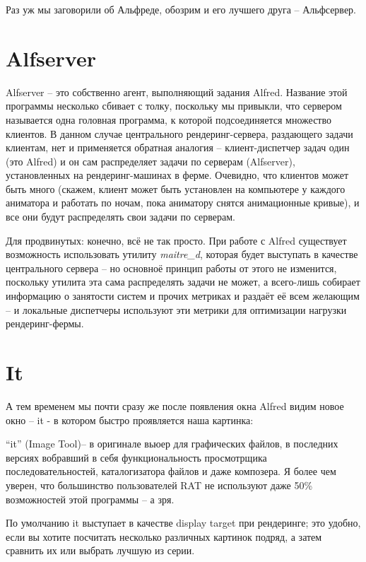 Раз уж мы заговорили об Альфреде, обозрим и его
    лучшего друга – Альфсервер.
  \section*{Alfserver}

 Alfserver – это собственно агент, выполняющий
    задания Alfred. Название этой программы несколько сбивает с толку,
    поскольку мы привыкли, что сервером называется одна головная
    программа, к которой подсоединяется множество клиентов. В данном
    случае центрального рендеринг-сервера, раздающего задачи клиентам,
    нет и применяется обратная аналогия – клиент-диспетчер задач один
    (это Alfred) и он сам распределяет задачи по серверам (Alfserver),
    установленных на рендеринг-машинах в ферме. Очевидно, что клиентов
    может быть много (скажем, клиент может быть установлен на
    компьютере у каждого аниматора и работать по ночам, пока аниматору
    снятся анимационные кривые), и все они будут распределять свои
    задачи по серверам.

 Для
    продвинутых: конечно, всё не так
    просто. При работе с Alfred существует
    возможность использовать утилиту {\it maitre\_d}, которая будет
    выступать в качестве центрального сервера – но основноё принцип
    работы от этого не изменится, поскольку утилита эта сама
    распределять задачи не может, а всего-лишь собирает информацию о
    занятости систем и прочих метриках и раздаёт её всем желающим – и
    локальные диспетчеры используют эти метрики для оптимизации
    нагрузки рендеринг-фермы.
  \section*{It}

 А тем временем мы почти сразу же после появления
    окна Alfred видим новое окно – it - в котором быстро проявляется
    наша картинка:


 “it” (Image Tool)– в оригинале вьюер для
    графических файлов, в последних версиях вобравший в себя
    функциональность просмотрщика последовательностей, каталогизатора
    файлов и даже композера. Я более чем уверен, что большинство
    пользователей RAT не используют даже 50\% возможностей этой
    программы – а зря.

 По умолчанию it выступает в качестве display target
    при рендеринге; это удобно, если вы хотите посчитать несколько
    различных картинок подряд, а затем сравнить их или выбрать лучшую
    из серии.

